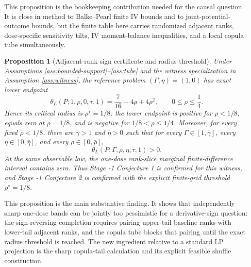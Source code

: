\documentclass[11pt]{article}
\theoremstyle{definition}
\theoremstyle{plain}
\newtheorem{proposition}{Proposition}
\theoremstyle{remark}
\begin{document}
This proposition is the bookkeeping contribution needed for the causal question.  It is close in method to Balke--Pearl finite IV bounds and to joint-potential-outcome bounds, but the finite table here carries randomized adjacent ranks, dose-specific sensitivity tilts, IV moment-balance inequalities, and a local copula tube simultaneously.

\begin{proposition}[Adjacent-rank sign certificate and radius threshold]\label{prop:sign-certificate}
Under Assumptions \ref{ass:bounded-support}--\ref{ass:tube} and the witness specialization in Assumption \ref{ass:witness}, the reference problem \((\Gamma,\eta)=(1,0)\) has exact lower endpoint
\[
\theta_L(P;1,\rho,0,\tau,1)=\frac{7}{16}-4\rho+4\rho^2,\qquad 0\le\rho\le\frac14.
\]
Hence its critical radius is \(\rho^\star=1/8\): the lower endpoint is positive for \(\rho<1/8\), equals zero at \(\rho=1/8\), and is negative for \(1/8<\rho\le1/4\).  Moreover, for every fixed \(\bar\rho<1/8\), there are \(\bar\gamma>1\) and \(\bar\eta>0\) such that for every \(\Gamma\in[1,\bar\gamma]\), every \(\eta\in[0,\bar\eta]\), and every \(\rho\in[0,\bar\rho]\),
\[
\theta_L(P;\Gamma,\rho,\eta,\tau,1)>0.
\]
At the same observable law, the one-dose rank-slice marginal finite-difference interval contains zero.  Thus Stage -1 Conjecture 1 is confirmed for this witness, and Stage -1 Conjecture 2 is confirmed with the explicit finite-grid threshold \(\rho^\star=1/8\).
\end{proposition}

This proposition is the main substantive finding.  It shows that independently sharp one-dose bands can be jointly too pessimistic for a derivative-sign question: the sign-reversing completion requires pairing upper-tail baseline ranks with lower-tail adjacent ranks, and the copula tube blocks that pairing until the exact radius threshold is reached.  The new ingredient relative to a standard LP projection is the sharp copula-tail calculation and its explicit feasible shuffle construction.
\end{document}
